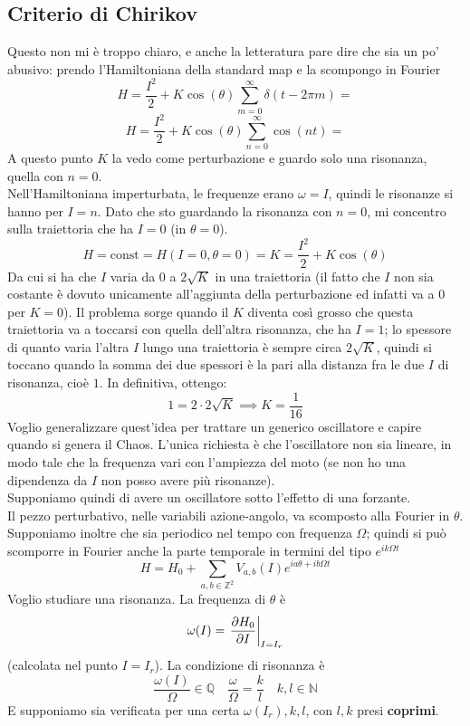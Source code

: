 \documentclass[a4paper,12pt]{article}
\theoremstyle{plain}
\theoremstyle{definition}
\newcommand{\f}[2]{\frac{#1}{#2}}
\theoremstyle{remark}
\begin{document}
\subsection{Criterio di Chirikov}
Questo non mi è troppo chiaro, e anche la letteratura pare dire che sia un po' abusivo: prendo l'Hamiltoniana della standard map e la scompongo in Fourier
\[H=\f{I^2}{2}	+K\cos(\theta)	\sum_{m=0}^{\infty} \delta(t-2\pi m)=	\]
\[H=\f{I^2}{2}	+K\cos(\theta)	\sum_{n=0}^{\infty} \cos(nt)=	\]
A questo punto $K$ la vedo come perturbazione e guardo solo una risonanza, quella con $n=0$. \\Nell'Hamiltoniana imperturbata, le frequenze erano $\omega=I$, quindi le risonanze si hanno per $I=n$.
Dato che sto guardando la risonanza con $n=0$, mi concentro sulla traiettoria che ha $I=0$ (in $\theta=0$).
\[H=\text{const}=H(I=0,\theta=0)=K=\f{I^2}{2}	+K\cos(\theta)	\]
Da cui si ha che $I$ varia da $0$ a $2\sqrt{K}$ in una traiettoria (il fatto che $I$ non sia costante è dovuto unicamente all'aggiunta della perturbazione ed infatti va a $0$ per $K=0$).
Il problema sorge quando il $K$ diventa così grosso che questa traiettoria va a toccarsi con quella dell'altra risonanza, che ha $I=1$; lo spessore di quanto varia l'altra $I$ lungo una traiettoria è sempre circa $2\sqrt{K}$, quindi si toccano quando la somma dei due spessori è la pari alla distanza fra le due $I$ di risonanza, cioè $1$.
In definitiva, ottengo:
\[1=2\cdot 2\sqrt{K}\implies K=\f{1}{16}\]
Voglio generalizzare quest'idea per trattare un generico oscillatore e capire quando si genera il Chaos. L'unica richiesta è che l'oscillatore non sia lineare, in modo tale che la frequenza vari con l'ampiezza del moto (se non ho una dipendenza da $I$ non posso avere più risonanze).\\
Supponiamo quindi di avere un oscillatore sotto l'effetto di una forzante.
\\Il pezzo perturbativo, nelle variabili azione-angolo, va scomposto alla Fourier in $\theta$. Supponiamo inoltre che sia periodico nel tempo con frequenza $\Omega$;  quindi si può scomporre in Fourier anche la parte temporale in termini del tipo $e^{ik\Omega t}$
\[H=H_0+\sum_{a,b\in\mathbb{Z}^2} V_{a,b}(I) e^{ia \theta+ib\Omega t} \]
Voglio studiare una risonanza. La frequenza di $\theta$ è
\[\omega(I)=\left.\pdv{H_0}{I}\right|_{I=I_r}	\]
(calcolata nel punto $I=I_r$).
La condizione di risonanza è
\[\f{\omega(I)}{\Omega}\in\mathbb{Q}\quad	\f{\omega}{\Omega}=\f{k}{l}\quad k,l\in\mathbb{N}	\]
E supponiamo sia verificata per una certa $\omega(I_r),k,l$, con $l,k$ presi \textbf{coprimi}.\\
\end{document}
